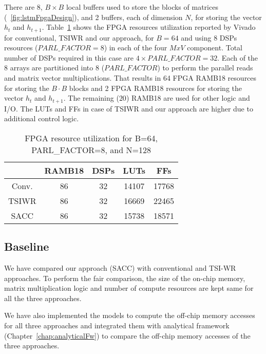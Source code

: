 {There are 8, $B{\times}B$ local buffers used to store the blocks of matrices (\figurename{~\ref{fig:lstmFpgaDesign}}), and 2 buffers, each of dimension $N$, for storing the vector $h_t$ and $h_{t{+}1}$. Table~\ref{tab:fpgaResources} shows the FPGA resources utilization reported by Vivado for conventional, TSIWR and our approach, for $B{=}64$ and using 8 DSPs resources ($PARL\_FACTOR{=}8$) in each of the four $MxV$ component.  Total number of DSPs required in this case are $4{\times}PARL\_FACTOR{=}32$.
Each of the 8 arrays are partitioned into 8 ($PARL\_FACTOR$) to perform the parallel reads and matrix vector multiplications. That results in 64 FPGA RAMB18 resources for storing the $B{\cdot}B$ blocks and 2 FPGA RAMB18 resources for storing the vector $h_t$ and $h_{t{+}1}$. The remaining ($20$) RAMB18 are used for other logic and I/O. The LUTs and FFs in case of TSIWR and our approach are higher due to additional control logic.
\begin{table}[htb]
	\centering
	\caption{FPGA resource utilization for B=64, PARL\_FACTOR=8, and N=128 }
	\label{tab:fpgaResources}
	\begin{tabular}{ccccc}
		\hline
		& RAMB18 & DSPs & LUTs  & FFs   \\ \hline
		Conv. & 86     & 32   & 14107 & 17768 \\ \hline
		TSIWR & 86     & 32   & 16669 & 22465 \\ \hline
		SACC  & 86     & 32   & 15738 & 18571 \\ \hline
	\end{tabular}
\end{table}
\subsection{Baseline}
We have compared our approach (SACC) with conventional and TSI-WR~\cite{park2020time} approaches. To perform the fair comparison, the size of the on-chip memory, matrix multiplication logic and number of compute resources are kept same for all the three approaches.

We have also implemented the models to compute the off-chip memory accesses for all three approaches and integrated them with analytical framework (Chapter~\ref{chap:analyticalFw}) to compare the off-chip memory accesses of the three approaches.
}
